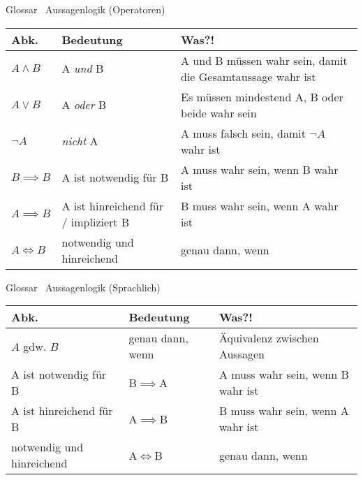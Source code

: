 \begin{frame}[fragile]{Glossar \textemdash\ Aussagenlogik (Operatoren)}
    \small
    \begin{tabular}{p{} p{} p{}}
        \toprule
        Abk.           & Bedeutung                            & Was?!                                                      \\
        \midrule
        $A\land B$     & A \textit{und} B                     & A und B müssen wahr sein, damit die Gesamtaussage wahr ist \\
        $A\lor B$      & A \textit{oder} B                    & Es müssen mindestend A, B oder beide wahr sein             \\
        $\lnot A$      & \textit{nicht} A                     & A muss falsch sein, damit $\lnot A$ wahr ist               \\
        $B \implies B$ & A ist notwendig für B                & A muss wahr sein, wenn B wahr ist                          \\
        $A \implies B$ & A ist hinreichend für / impliziert B & B muss wahr sein, wenn A wahr ist                          \\
        $A \iff B$     & notwendig und hinreichend            & genau dann, wenn                                           \\
        \bottomrule
    \end{tabular}
\end{frame}

\begin{frame}[fragile]{Glossar \textemdash\ Aussagenlogik (Sprachlich)}
    \small
    \begin{tabular}{p{} p{} p{}}
        \toprule
        Abk.                      & Bedeutung        & Was?!                             \\
        \midrule
        $A$ gdw. $B$              & genau dann, wenn & Äquivalenz zwischen Aussagen      \\
        A ist notwendig für B     & B$\implies$A     & A muss wahr sein, wenn B wahr ist \\
        A ist hinreichend für B   & A$\implies$B     & B muss wahr sein, wenn A wahr ist \\
        notwendig und hinreichend & A$\iff$B         & genau dann, wenn                  \\
        \bottomrule
    \end{tabular}
\end{frame}